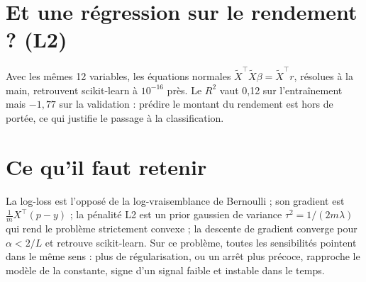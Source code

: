 \documentclass[11pt,a4paper]{article}
\begin{document}
\section{Et une régression sur le rendement ? (L2)}

Avec les mêmes 12 variables, les équations normales $\tilde X^\top\tilde X\beta=\tilde X^\top r$, résolues à la main,
retrouvent scikit-learn à $10^{-16}$ près. Le $R^2$ vaut 0,12 sur l'entraînement mais $-1{,}77$ sur la validation :
prédire le montant du rendement est hors de portée, ce qui justifie le passage à la classification.

\section*{Ce qu'il faut retenir}

La log-loss est l'opposé de la log-vraisemblance de Bernoulli ; son gradient est $\frac1mX^\top(p-y)$ ; la pénalité
L2 est un prior gaussien de variance $\tau^2=1/(2m\lambda)$ qui rend le problème strictement convexe ; la descente de
gradient converge pour $\alpha<2/L$ et retrouve scikit-learn. Sur ce problème, toutes les sensibilités pointent dans le
même sens : plus de régularisation, ou un arrêt plus précoce, rapproche le modèle de la constante, signe d'un signal
faible et instable dans le temps.
\end{document}
